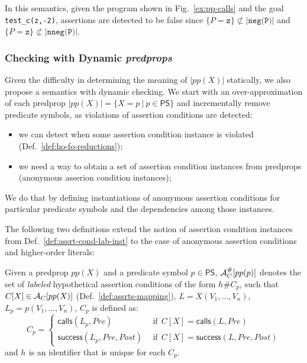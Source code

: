 \documentclass{llncs}
\newcommand{\PS}{\textsf{PS}}
\newcommand{\AC}
  {\ensuremath{{\cal A}_{C}}}
\newcommand{\ACpp}[1]
  {\ensuremath{\AC[#1]}}
\newcommand{\LabACpp}[1]
  {\ensuremath{\AC^{\#}[#1]}}
\newcommand{\hypId}[1]{\ensuremath{h_{#1}}}
\newcommand{\callsAsr}[2]{\ensuremath{\textsf{calls}(#1, #2)}}
\newcommand{\successAsr}[3]{\ensuremath{\textsf{success}(#1, #2, #3)}}
\begin{document}
In this semantics, given the program shown in Fig.~\ref{ex:pp-calls}
and the goal \texttt{test\_c(z,-2)}, assertions are detected to be
false since $\{P=\texttt{z}\} \not\subset |\texttt{neg(P)}|$ and 
$\{P=\texttt{z}\} \not\subset |\texttt{nneg(P)}|$.



\subsubsection{Checking with Dynamic \emph{predprops}}
Given the difficulty in determining the meaning of $|pp(X)|$
statically, we also propose a semantics with dynamic checking.
We start with an over-approximation of each predprop $|pp(X)| = \{ X =
p ~|~ p \in \PS \}$ and incrementally remove predicate symbols, as
violations of assertion conditions are detected:
\begin{itemize}
\item we can detect when some assertion condition instance is violated
  (Def.~\ref{def:ho-fo-reductions});
\item we need a way to obtain a set of assertion condition instances
  from predprops (anonymous asserion condition instances);
\end{itemize}
We do that by defining instantiations of anonymous assertion
conditions for particular predicate symbols and the dependencies among
those instances.

The following two definitions extend the notion of assertion condition
instances from Def.~\ref{def:assrt-cond-lab-inst} to the case of
anonymous assertion conditions and higher-order literals:
\begin{definition}
  \label{def:lab-hyp-assrt-cond}
  Given a predprop $pp(X)$ and a predicate symbol $p \in \PS$,
$\LabACpp{pp(p)}$ denotes the set of \emph{labeled} hypothetical
  assertion conditions of the form $\hypId{}\#C_p$,
such that
$C[X] \in \ACpp{pp(X)}$ (Def.~\ref{def:assrts-mapping}),
$L = X(V_1,\ldots,V_n)$,
$L_p = p(V_1,\ldots,V_n)$,
$C_p$ is defined as:
  \[
    C_p = \left\{
    \begin{array}{ll}
      \callsAsr{L_p}{Pre} 
    & ~~\textrm{if}~~ C[X] = \callsAsr{L}{Pre}
    \\
      \successAsr{L_p}{Pre}{Post}   
    & ~~\textrm{if}~~ C[X] = \successAsr{L}{Pre}{Post}
    \end{array}
    \right.
  \]
and $\hypId{}$ is an identifier that is unique for each $C_p$.
\end{definition}
\end{document}
